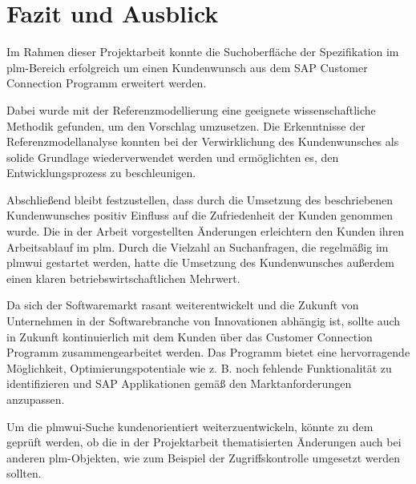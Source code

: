 \chapter{Fazit und Ausblick}

Im Rahmen dieser Projektarbeit konnte die Suchoberfläche der Spezifikation im \ac{plm}-Bereich erfolgreich um einen Kundenwunsch aus dem SAP Customer Connection Programm erweitert werden. 

Dabei wurde mit der Referenzmodellierung eine geeignete wissenschaftliche Methodik gefunden, um den Vorschlag umzusetzen. Die Erkenntnisse der Referenzmodellanalyse konnten bei der Verwirklichung des Kundenwunsches als solide Grundlage wiederverwendet werden und ermöglichten es, den Entwicklungsprozess zu beschleunigen.



Abschließend bleibt festzustellen, dass durch die Umsetzung des beschriebenen Kundenwunsches positiv Einfluss auf die Zufriedenheit der Kunden genommen wurde. Die in der Arbeit vorgestellten Änderungen erleichtern den Kunden ihren Arbeitsablauf im \acl{plm}. Durch die Vielzahl an Suchanfragen, die regelmäßig im \ac{plmwui} gestartet werden, hatte die Umsetzung des Kundenwunsches außerdem einen klaren betriebswirtschaftlichen Mehrwert.

Da sich der Softwaremarkt rasant weiterentwickelt und die Zukunft von Unternehmen in der Softwarebranche von Innovationen abhängig ist, sollte auch in Zukunft kontinuierlich mit dem Kunden über das Customer Connection Programm zusammengearbeitet werden. Das Programm bietet eine hervorragende Möglichkeit, Optimierungspotentiale wie z. B. noch fehlende Funktionalität zu identifizieren und SAP Applikationen gemäß den Marktanforderungen anzupassen. 

Um die \ac{plmwui}-Suche kundenorientiert weiterzuentwickeln, könnte zu dem geprüft werden, ob die in der Projektarbeit thematisierten Änderungen auch bei anderen \ac{plm}-Objekten, wie zum Beispiel der Zugriffskontrolle umgesetzt werden sollten.


